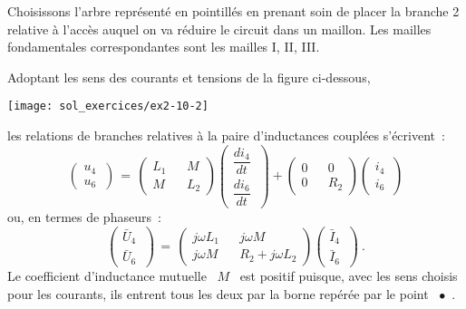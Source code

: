 Choisissons l'arbre représenté en pointillés en prenant soin de placer
la branche 2 relative à l'accès auquel on va réduire le circuit dans
un maillon. Les mailles fondamentales correspondantes sont les
mailles I, II, III.

Adoptant les sens des courants et tensions de la
figure ci-dessous, 
\begin{center}
	\texttt{[image: sol\_exercices/ex2-10-2]}
\end{center}
les relations de branches relatives à la paire
d'inductances couplées s'écrivent~:
\[ \left( \begin{array}{c} u_4\\ u_6 \ \end{array} \right) 
\, = \, \left( \begin{array}{ccc} L_1 && M \\ M && L_2 \end{array} \right)
\left( \begin{array}{c} \dfrac{di_4}{dt} \\ \dfrac{di_6}{dt}  \ \end{array} \right) 
+ \left( \begin{array}{ccc} 0 && 0 \\ 0 && R_2 \end{array} \right)
\left( \begin{array}{c} i_4\\ i_6 \ \end{array} \right)  \]
ou, en termes de phaseurs~:
\[ \left( \begin{array}{c} \bar{U}_4\\ \bar{U}_6 \ \end{array} \right) 
\, = \, \left( \begin{array}{ccc} j\omega L_1 && j\omega M \\ j\omega
M && R_2 + j\omega L_2 \end{array} \right) \left( \begin{array}{c}
\bar{I}_4\\ \bar{I}_6 \ \end{array} \right)~.  \] 
Le coefficient
d'inductance mutuelle \ $M$ \ est positif puisque, avec les sens
choisis pour les courants, ils entrent tous les deux par la borne
repérée par le point \ $\bullet$~.

